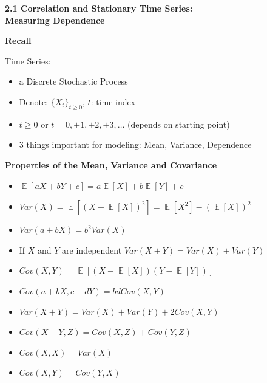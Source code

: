 \documentclass[12pt]{article} %
\date{}
\DeclareMathOperator{\E}{\mathbb{E}}
\begin{document}
\textbf{\Large 2.1  Correlation and Stationary Time Series: \\ Measuring Dependence}

\medskip


{}




\medskip
\medskip

\noindent\textbf{Recall}

Time Series: 
\begin{itemize}
	\item a Discrete Stochastic Process
	\item Denote: $\{X_t\}_{t\geq 0}$, $t$: time index
	\item ${t\geq 0}$ or $ t=0, \pm 1, \pm 2, \pm 3, \dots $ (depends on starting point)
	\item 3 things important for modeling:  Mean, Variance, Dependence
\end{itemize}

\noindent \textbf{Properties of the Mean, Variance and Covariance}
\begin{itemize}
\item $\E[aX+bY+c]=a\E[X]+b\E[Y]+c$
\item $Var(X)=\E[(X-\E[X])^2]=\E[X^2]-(\E[X])^2$
\item $Var(a+bX)=b^2Var(X)$
\item If $X$ and $Y$ are independent $Var(X+Y)=Var(X)+Var(Y)$
\item $Cov(X,Y)=\E[(X-\E[X])(Y-\E[Y])]$ 
\item  $Cov(a+bX,c+dY)=bd Cov(X,Y)$
\item $Var(X+Y)=Var(X)+Var(Y)+2Cov(X,Y)$
\item $Cov(X+Y,Z)=Cov(X,Z)+Cov(Y,Z)$
\item $Cov(X,X)=Var(X)$
\item $Cov(X,Y)=Cov(Y,X)$
\end{itemize}
\end{document}

